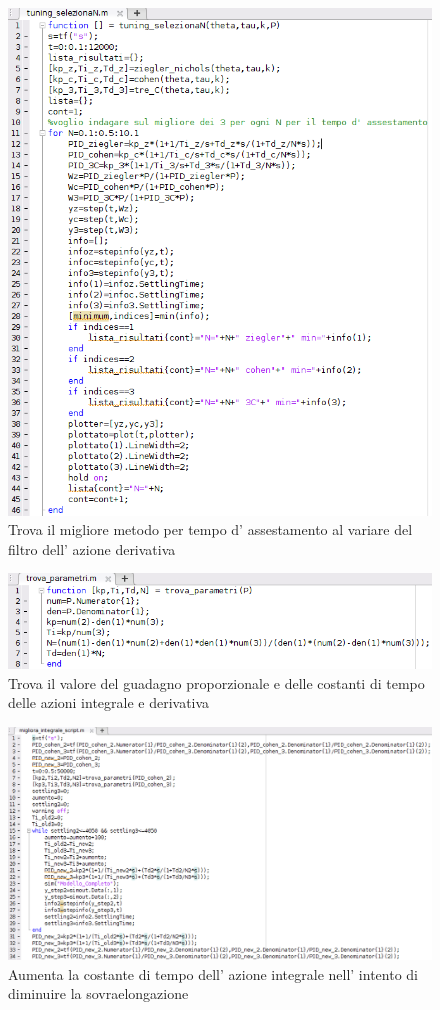 \documentclass[Lau,noexaminfo]{sapthesis}
\begin{document}
	\begin{figure}
	\includegraphics[scale=0.5]{tuning_selezionaN}
	\caption{Trova il migliore metodo per tempo d' assestamento al variare del filtro dell' azione derivativa}
	\end{figure}
	\begin{figure}
		\includegraphics[scale=0.5]{trova_parametri}
		\caption{Trova il valore del guadagno proporzionale e delle costanti di tempo delle azioni integrale e derivativa}
	\end{figure}
	\begin{figure}
		\includegraphics[scale=0.5,angle=90]{migliora_integrale_script}
		\caption{Aumenta la costante di tempo dell' azione integrale nell' intento di diminuire la sovraelongazione}
	\end{figure}
\end{document}

